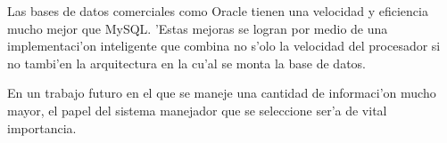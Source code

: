 Las bases de datos comerciales como Oracle tienen una velocidad y
eficiencia mucho mejor que MySQL. 'Estas mejoras se logran por medio
de una implementaci'on inteligente que combina no s'olo la velocidad
del procesador si no tambi'en la arquitectura en la cu'al se monta la
base de datos.

En un trabajo futuro en el que se maneje una cantidad de informaci'on
mucho mayor, el papel del sistema manejador que se seleccione ser'a de
vital importancia. 






